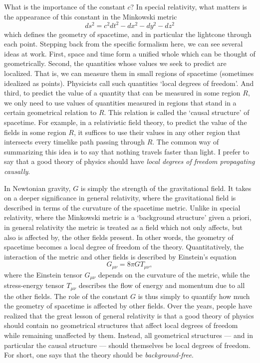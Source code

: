 \documentclass[12pt,amsfonts]{article}
\begin{document}
What is the importance of the constant $c$?   In special relativity,
what matters is the appearance of this constant in the Minkowski
metric 
\[                ds^2 = c^2 dt^2 - dx^2 - dy^2 - dz^2  \] 
which defines the geometry of spacetime, and in particular the lightcone
through each point.  Stepping back from the specific formalism here, we
can see several ideas at work.  First, space and time form a unified
whole which can be thought of geometrically.  Second, the quantities
whose values we seek to predict are localized.  That is, we can measure
them in small regions of spacetime (sometimes idealized as points).  
Physicists call such quantities `local degrees of freedom'.  And third,
to predict the value of a quantity that can be measured in some region
$R$, we only need to use values of quantities measured in regions that
stand in a certain geometrical relation to $R$.  This relation is called
the `causal structure' of spacetime.  For example, in a relativistic
field theory, to predict the value of the fields in some region $R$, it
suffices to use their values in any other region that intersects every
timelike path passing through $R$.  The common way of summarizing this
idea is to say that nothing travels faster than light.  I prefer to say
that a good theory of physics should have {\it local degrees of freedom
propagating causally}. 

In Newtonian gravity, $G$ is simply the strength of the gravitational
field.  It takes on a deeper significance in general relativity, where
the gravitational field is described in terms of the curvature of the
spacetime metric.  Unlike in special relativity, where the Minkowski 
metric is a `background structure' given a priori, in general relativity
the metric is treated as a field which not only affects, but also is
affected by, the other fields present.  In other words, the geometry of
spacetime becomes a local degree of freedom of the theory.
Quantitatively, the interaction of the metric and other fields is
described by Einstein's equation
\[                 G_{\mu \nu} = 8\pi G T_{\mu \nu} ,\]
where the Einstein tensor $G_{\mu \nu}$ depends on the curvature of the
metric, while the stress-energy tensor $T_{\mu \nu}$ describes the flow
of energy and momentum due to all the other fields.  The role of the
constant $G$ is thus simply to quantify how much the geometry of
spacetime is affected by other fields.   Over the years, people have
realized that the great lesson of general relativity is that a good
theory of physics should contain no geometrical structures that affect
local degrees of freedom while remaining unaffected by them.  Instead,
all geometrical structures --- and in particular the causal structure ---
should themselves be local degrees of freedom.  For short, one says
that the theory should be {\it background-free}.
 
\end{document}
